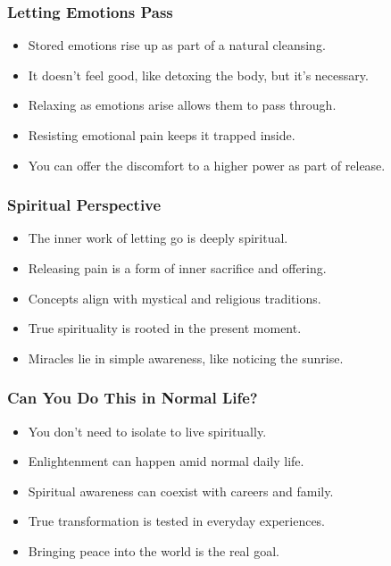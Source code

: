 \begin{frame}[fragile]\frametitle{Letting Emotions Pass}
    \begin{itemize}
        \item Stored emotions rise up as part of a natural cleansing.
        \item It doesn’t feel good, like detoxing the body, but it’s necessary.
        \item Relaxing as emotions arise allows them to pass through.
        \item Resisting emotional pain keeps it trapped inside.
        \item You can offer the discomfort to a higher power as part of release.
    \end{itemize}
\end{frame}

\begin{frame}[fragile]\frametitle{Spiritual Perspective}
    \begin{itemize}
        \item The inner work of letting go is deeply spiritual.
        \item Releasing pain is a form of inner sacrifice and offering.
        \item Concepts align with mystical and religious traditions.
        \item True spirituality is rooted in the present moment.
        \item Miracles lie in simple awareness, like noticing the sunrise.
    \end{itemize}
\end{frame}

\begin{frame}[fragile]\frametitle{Can You Do This in Normal Life?}
    \begin{itemize}
        \item You don’t need to isolate to live spiritually.
        \item Enlightenment can happen amid normal daily life.
        \item Spiritual awareness can coexist with careers and family.
        \item True transformation is tested in everyday experiences.
        \item Bringing peace into the world is the real goal.
    \end{itemize}
\end{frame}

